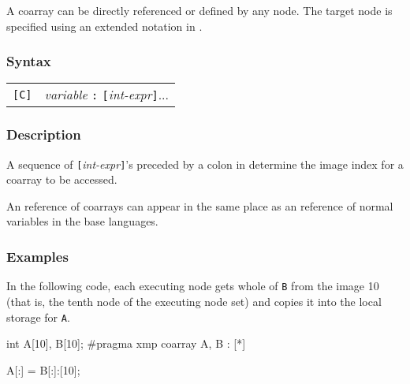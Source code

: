 A coarray can be directly referenced or defined by any node. The target
node is specified using an extended notation in {\XMPC}.

\subsubsection*{Syntax}

\begin{tabular}{ll}
\verb![C]! & {\it variable} {\tt :} {\tt [}{\it int-expr}{\tt ]}...\\
\end{tabular}

\subsubsection*{Description}

A sequence of {\tt [}{\it int-expr}{\tt ]}'s preceded by a colon in
{\XMPC} determine the image index for a coarray to be accessed.

An reference of coarrays can appear in the same place as an reference of
normal variables in the base languages.

\subsubsection*{Examples}

In the following code, each executing node gets whole of {\tt B} from
the image 10 (that is, the tenth node of the executing node set) and
copies it into the local storage for {\tt A}.

\vspace{0.3cm}

\begin{XCexample}
int A[10], B[10];
#pragma xmp coarray A, B : [*]

A[:] = B[:]:[10];
\end{XCexample}

